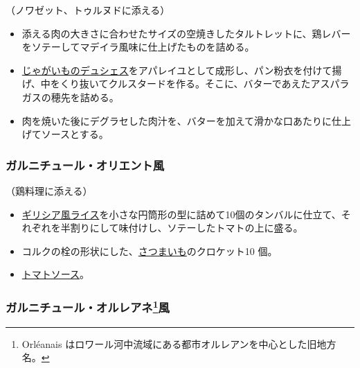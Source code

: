 \begin{recette}


（ノワゼット、トゥルヌドに添える）

\begin{itemize}
\item
  添える肉の大きさに合わせたサイズの空焼きしたタルトレットに、鶏レバーをソテーしてマデイラ風味に仕上げたものを詰める。
\item
  \protect\hyperlink{pommes-de-teres-duchesse}{じゃがいものデュシェス}をアパレイユとして成形し、パン粉衣を付けて揚げ、中をくり抜いてクルスタードを作る。そこに、バターであえたアスパラガスの穂先を詰める。
\item
  肉を焼いた後にデグラセした肉汁を、バターを加えて滑かな口あたりに仕上げてソースとする。
\end{itemize}

\hypertarget{garniture-a-l-orientale}{%
\subsubsection{ガルニチュール・オリエント風}\label{garniture-a-l-orientale}}



（鶏料理に添える）

\begin{itemize}
\item
  \protect\hyperlink{riz-a-la-grecque}{ギリシア風ライス}を小さな円筒形の型に詰めて10個のタンバルに仕立て、それぞれを半割りにして味付けし、ソテーしたトマトの上に盛る。
\item
  コルクの栓の形状にした、\protect\hyperlink{patates-douces}{さつまいも}のクロケット10
  個。
\item
  \protect\hyperlink{sauce-tomate}{トマトソース}。
\end{itemize}

\hypertarget{garniture-a-l-oreanaise}{%
\subsubsection[ガルニチュール・オルレアネ風]{\texorpdfstring{ガルニチュール・オルレアネ\footnote{Orléanais
  はロワール河中流域にある都市オルレアンを中心とした旧地方名。}風}{ガルニチュール・オルレアネ風}}\label{garniture-a-l-oreanaise}}


\end{recette}
